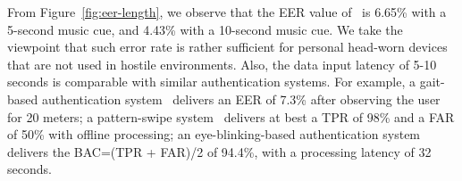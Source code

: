 From Figure~\ref{fig:eer-length}, we observe that the EER value of \systemname~is 6.65\% with a 5-second music cue, and 4.43\% with a 10-second music cue. We take the viewpoint that such error rate is rather sufficient for personal head-worn devices that are not used in hostile environments. Also, the data input latency of 5-10 seconds is comparable with similar authentication systems. For example, a gait-based authentication system~\cite{gafurov2006biometric} delivers an EER of 7.3\% after observing the user for 20 meters;
a pattern-swipe system~\cite{de2012touch} delivers at best a TPR of 98\% and a FAR of 50\%  with offline processing; an eye-blinking-based authentication system~\cite{rogers2015approach} delivers the BAC=(TPR + FAR)/2 of 94.4\%, with a processing latency of 32 seconds.
%






